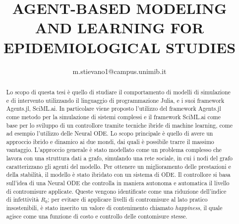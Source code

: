 \documentclass{article}
\title{AGENT-BASED MODELING AND LEARNING FOR EPIDEMIOLOGICAL STUDIES}
\author{m.stievano1@campus.unimib.it}
\begin{document}


\begin{abstract}
    Lo scopo di questa tesi è quello di studiare il comportamento di modelli di simulazione
    e di intervento utilizzando il linguaggio di programmazione Julia, e i suoi framework
    Agents.jl, SciML.ai. In particolare viene proposto l'utilizzo del framework Agents.jl come 
    metodo per la simulazione di sistemi complessi e il framework SciML.ai come base per 
    lo sviluppo di un controllore tramite tecniche ibride di machine learning, come ad esempio 
    l'utilizzo delle Neural ODE. Lo scopo principale è quello di avere un approccio ibrido e dinamico 
    ai due mondi, dai quali è possibile trarre il massimo vantaggio. L'approccio generale 
    è stato modellato come un problema complesso che lavora con una struttura dati a grafo, simulando
    una rete sociale, in cui i nodi del grafo caratterizzano gli agenti del modello. Per ottenere un 
    miglioramento delle prestazioni e della stabilità, il modello è stato ibridato con 
    un sistema di ODE. Il controllore si basa sull'idea di una Neural ODE che controlla 
    in maniera autonoma e automatica il livello di contromisure applicate. Queste vengono 
    identificate come una riduzione dell'indice di infettività $R_0$; per evitare di applicare 
    livelli di contromisure al lato pratico insostenibili, è stato inserito un valore di contenimento 
    chiamato \emph{happiness}, il quale agisce come una funzione di costo e controllo delle contomisure stesse.
\end{abstract}



\tableofcontents
\newpage
\listoffigures
\newpage














% 
% 

\nocite{*}

% 
% 



\appendix

\end{document}

